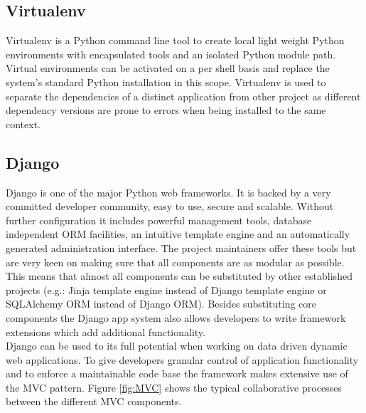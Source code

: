 \documentclass[BachelorPaper]{subfiles}
\begin{document}


\subsection{Virtualenv}
Virtualenv is a Python command line tool to create local light weight Python environments with encapsulated tools and an isolated Python module path. Virtual environments can be activated on a per shell basis and replace the system's standard Python installation in this scope. Virtualenv is used to separate the dependencies of a distinct application from other project as different dependency versions are prone to errors when being installed to the same context.

\subsection{Django}
Django is one of the major Python web frameworks. It is backed by a very committed developer community, easy to use, secure and scalable. Without further configuration it includes powerful management tools, database independent \ac{ORM} facilities, an intuitive template engine and an automatically generated administration interface. The project maintainers offer these tools but are very keen on making sure that all components are as modular as possible. This means that almost all components can be substituted by other established projects (e.g.: Jinja template engine instead of Django template engine or SQLAlchemy \ac{ORM} instead of Django \ac{ORM}). Besides substituting core components the Django app system also allows developers to write framework extensions which add additional functionality.\\

Django can be used to its full potential when working on data driven dynamic web applications. To give developers granular control of application functionality and to enforce a maintainable code base the framework makes extensive use of the \ac{MVC} pattern. Figure \ref{fig:MVC} shows the typical collaborative processes between the different \ac{MVC} components.
\end{document}
